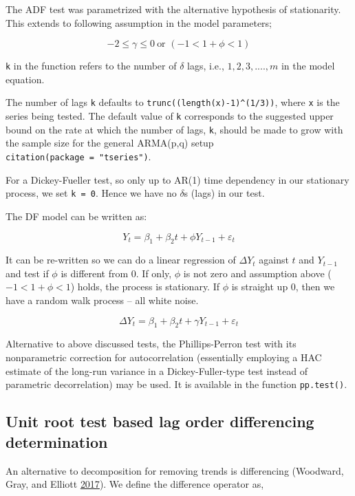\documentclass[12pt,]{article}
\begin{document}
The ADF test was parametrized with the alternative hypothesis of stationarity. This extends to following assumption in the model parameters;

\[
-2 \leq \gamma \leq 0\ \text{or } (-1 < 1+\phi < 1)
\]

\texttt{k} in the function refers to the number of \(\delta\) lags, i.e., \(1, 2, 3, ...., m\) in the model equation.

The number of lags \texttt{k} defaults to \texttt{trunc((length(x)-1)\^{}(1/3))}, where \texttt{x} is the series being tested. The default value of \texttt{k} corresponds to the suggested upper bound on the rate at which the number of lags, \texttt{k}, should be made to grow with the sample size for the general ARMA(p,q) setup \texttt{citation(package\ =\ "tseries")}.

For a Dickey-Fueller test, so only up to AR(1) time dependency in our stationary process, we set \texttt{k\ =\ 0}. Hence we have no \(\delta\)s (lags) in our test.

The DF model can be written as:

\[
Y_t = \beta_1 + \beta_2 t + \phi Y_{t-1} + \varepsilon_t
\]

It can be re-written so we can do a linear regression of \(\Delta Y_t\) against \(t\) and \(Y_{t-1}\) and test if \(\phi\) is different from 0. If only, \(\phi\) is not zero and assumption above (\(-1 < 1+\phi < 1\)) holds, the process is stationary. If \(\phi\) is straight up 0, then we have a random walk process -- all white noise.

\[
\Delta {Y}_{t}=\beta_1+\beta_2 t+\gamma {Y}_{t-1} + \varepsilon_{t}
\]

Alternative to above discussed tests, the Phillips-Perron test with its nonparametric correction for autocorrelation (essentially employing a HAC estimate of the long-run variance in a Dickey-Fuller-type test instead of parametric decorrelation) may be used. It is available in the function \texttt{pp.test()}.

\hypertarget{unit-root-test-based-lag-order-differencing-determination}{%
\subsection{Unit root test based lag order differencing determination}\label{unit-root-test-based-lag-order-differencing-determination}}

An alternative to decomposition for removing trends is differencing (Woodward, Gray, and Elliott \protect\hyperlink{ref-woodward2017applied}{2017}). We define the difference operator as,
\end{document}
